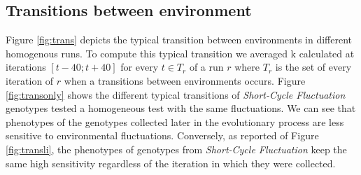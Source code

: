 \subsection{Transitions between environment} 
Figure \ref{fig:trans} depicts the typical transition between environments in different homogenous runs. To compute this typical transition we averaged k calculated at iterations $[t-40; t + 40]$ for every $t \in T_r$ of a run $r$ where $T_r$ is the set of every iteration of $r$ when a transitions between environments occurs. Figure  \ref{fig:transonly} shows the different typical transitions of \emph{Short-Cycle Fluctuation} genotypes tested a homogeneous test with the same fluctuations. We can see that phenotypes of the genotypes collected later in the evolutionary process are less sensitive to environmental fluctuations. Conversely, as reported of Figure \ref{fig:transli}, the phenotypes of genotypes from \emph{Short-Cycle Fluctuation} keep the same high sensitivity regardless of the iteration in which they were collected.


